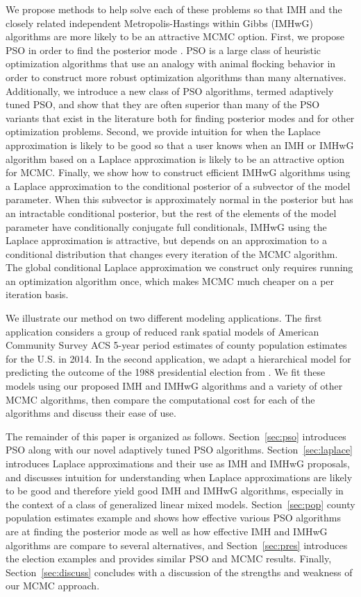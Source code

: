 \documentclass[12pt]{article}
\begin{document}
We propose methods to help solve each of these problems so that IMH and the closely related independent Metropolis-Hastings within Gibbs (IMHwG) algorithms are more likely to be an attractive MCMC option. First, we propose PSO in order to find the posterior mode \citep{clerc2002particle,blum2008swarm,clerc2010particle}. PSO is a large class of heuristic optimization algorithms that use an analogy with animal flocking behavior in order to construct more robust optimization algorithms than many alternatives. Additionally, we introduce a new class of PSO algorithms, termed adaptively tuned PSO, and show that they are often superior than many of the PSO variants that exist in the literature both for finding posterior modes and for other optimization problems. Second, we provide intuition for when the Laplace approximation is likely to be good so that a user knows when an IMH or IMHwG algorithm based on a Laplace approximation is likely to be an attractive option for MCMC. Finally, we show how to construct efficient IMHwG algorithms using a Laplace approximation to the conditional posterior of a subvector of the model parameter. When this subvector is approximately normal in the posterior but has an intractable conditional posterior, but the rest of the elements of the model parameter have conditionally conjugate full conditionals, IMHwG using the Laplace approximation is attractive, but depends on an approximation to a conditional distribution that changes every iteration of the MCMC algorithm. The global conditional Laplace approximation we construct only requires running an optimization algorithm once, which makes MCMC much cheaper on a per iteration basis.

We illustrate our method on two different modeling applications. The first application considers a group of reduced rank spatial models of American Community Survey ACS 5-year period estimates of county population estimates for the U.S. in 2014. In the second application, we adapt a hierarchical model for predicting the outcome of the 1988 presidential election from \citet{gelman2006data}. We fit these models using our proposed IMH and IMHwG algorithms and a variety of other MCMC algorithms, then compare the computational cost for each of the algorithms and discuss their ease of use. 

The remainder of this paper is organized as follows. Section~\ref{sec:pso} introduces PSO along with our novel adaptively tuned PSO algorithms.  Section~\ref{sec:laplace} introduces Laplace approximations and their use as IMH and IMHwG proposals, and discusses intuition for understanding when Laplace approximations are likely to be good and therefore yield good IMH and IMHwG algorithms, especially in the context of a class of generalized linear mixed models. Section~\ref{sec:pop} county population estimates example and shows how effective various PSO algorithms are at finding the posterior mode as well as how effective IMH and IMHwG algorithms are compare to several alternatives, and Section~\ref{sec:pres} introduces the election examples and provides similar PSO and MCMC results. Finally, Section~\ref{sec:discuss} concludes with a discussion of the strengths and weakness of our MCMC approach.
\end{document}
